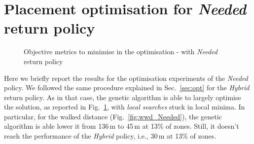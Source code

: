 \section{Placement optimisation for \textit{Needed} return policy}
\label{sec:7_7b_needed}

 
 \begin{figure}[h]
     \centering     %
     \caption{Objective metrics to minimise in the optimisation - with \textit{Needed} return policy}
    \label{fig:optimized_metrics_needed}
 \end{figure}
 
Here  we briefly report the results for the optimisation experiments of the \textit{Needed} policy.
We followed the same procedure explained in Sec.~\ref{sec:opt} for the \textit{Hybrid} return policy. As in that case, the genetic algorithm is able to largely optimise the solution, as reported in Fig.~\ref{fig:optimized_metrics_needed}, with \textit{local searches} stuck in local minima. 
In particular, for the walked distance (Fig.~\ref{fig:wwd_Needed}), the genetic algorithm is able lower it from 136\,m to 45\,m at 13\% of zones. Still, it doesn't reach the performance of the \textit{Hybrid} policy, i.e., 30\,m at 13\% of zones.


